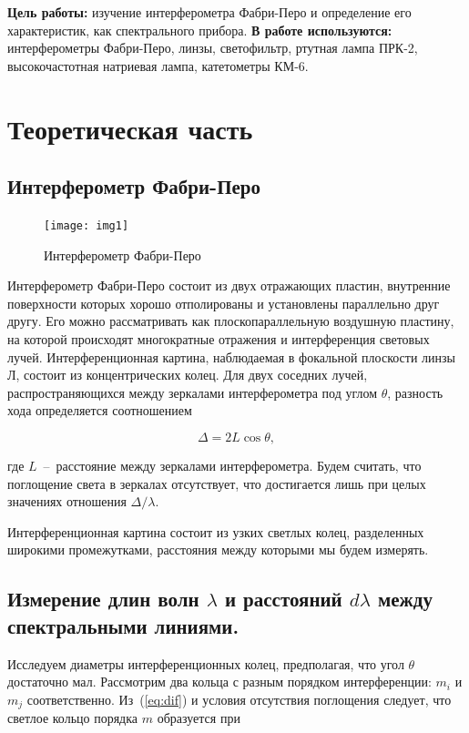 \documentclass{letask}
\begin{document}


\textbf{Цель работы:}
изучение интерферометра Фабри-Перо и определение его характеристик, как спектрального прибора.
\textbf{В работе используются:} интерферометры Фабри-Перо, линзы, светофильтр, ртутная лампа ПРК-2, высокочастотная натриевая лампа, катетометры КМ-6.

\section{Теоретическая часть}

\subsection*{Интерферометр Фабри-Перо}

\begin{figure}
\texttt{[image: img1]}
\caption{Интерферометр Фабри-Перо}
\end{figure}

Интерферометр Фабри-Перо состоит из двух отражающих пластин, внутренние поверхности которых хорошо отполированы и установлены параллельно друг другу. Его можно рассматривать как плоскопараллельную воздушную пластину, на которой происходят многократные отражения и интерференция световых лучей. Интерференционная картина, наблюдаемая в фокальной плоскости линзы Л, состоит из концентрических колец. 
Для двух соседних лучей, распространяющихся между зеркалами интерферометра под углом $\theta$, разность хода определяется соотношением
 
\begin{equation}
\Delta = 2 L \cos \theta,
\label{eq:dif}
\end{equation}

где $L$~--~расстояние между зеркалами интерферометра.
Будем считать, что поглощение света в зеркалах отсутствует, что достигается лишь при целых значениях отношения $\Delta / \lambda$.

Интерференционная картина состоит из узких светлых колец, разделенных широкими промежутками, расстояния между которыми мы будем измерять.

\subsection*{Измерение длин волн $\lambda$ и расстояний $d \lambda$ между спектральными линиями.}

Исследуем диаметры интерференционных колец, предполагая, что угол $\theta$ достаточно мал.
Рассмотрим два кольца с разным порядком интерференции: $m_i$ и $m_j$ соответственно. 
Из~(\ref{eq:dif}) и условия отсутствия поглощения следует, что светлое кольцо порядка $m$ образуется при 
\end{document}

